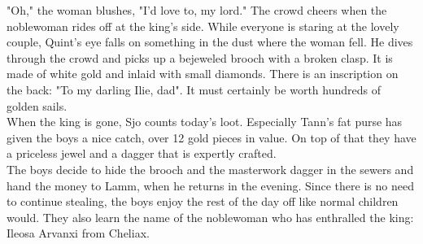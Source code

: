 "Oh," the woman blushes, "I'd love to, my lord." The crowd cheers when the noblewoman rides off at the king's side. While everyone is staring at the lovely couple, Quint's eye falls on something in the dust where the woman fell. He dives through the crowd and picks up a bejeweled brooch with a broken clasp. It is made of white gold and inlaid with small diamonds. There is an inscription on the back: "To my darling Ilie, dad". It must certainly be worth hundreds of golden sails.\\

When the king is gone, Sjo counts today's loot. Especially Tann's fat purse has given the boys a nice catch, over 12 gold pieces in value. On top of that they have a priceless jewel and a dagger that is expertly crafted.\\

The boys decide to hide the brooch and the masterwork dagger in the sewers and hand the money to Lamm, when he returns in the evening. Since there is no need to continue stealing, the boys enjoy the rest of the day off like normal children would. They also learn the name of the noblewoman who has enthralled the king: Ileosa Arvanxi from Cheliax.\\

